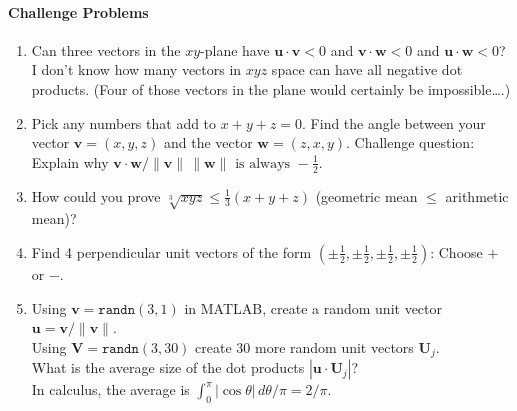 \documentclass[14pt, a4paper]{article}
\begin{document}
\paragraph{Challenge Problems}
\begin{enumerate}[resume]
    \item Can three vectors in the $xy$-plane have $\boldsymbol{u} \cdot \boldsymbol{v} < 0$ and $\boldsymbol{v} \cdot \boldsymbol{w} < 0$ and $\boldsymbol{u} \cdot \boldsymbol{w} < 0$? \\
          I don't know how many vectors in $xyz$ space can have all negative dot products. (Four of those vectors in the plane would certainly be impossible\dots.)

    \item Pick any numbers that add to $x + y + z = 0$. Find the angle between your vector $\boldsymbol{v} = (x, y, z)$ and the vector $\boldsymbol{w} = (z, x, y)$. Challenge question: Explain why
          $
              \boldsymbol{v} \cdot \boldsymbol{w} / \|\boldsymbol{v}\| \, \|\boldsymbol{w}\| \text{ is always } -\frac{1}{2}.
          $

    \item How could you prove $\sqrt[3]{xyz} \le \frac{1}{3}(x + y + z)$ (geometric mean $\le$ arithmetic mean)?

    \item Find 4 perpendicular unit vectors of the form $\left(\pm \tfrac{1}{2}, \pm \tfrac{1}{2}, \pm \tfrac{1}{2}, \pm \tfrac{1}{2}\right)$: Choose $+$ or $-$.

    \item Using $\boldsymbol{v} = \texttt{randn}(3,1)$ in \textcolor{blue!60!white}{MATLAB}, create a random unit vector $\boldsymbol{u} = \boldsymbol{v}/\|\boldsymbol{v}\|$.
          \\ Using $\boldsymbol{V} = \texttt{randn}(3,30)$ create 30 more random unit vectors $\boldsymbol{U}_j$.
          \\ What is the average size of the dot products $|\boldsymbol{u} \cdot \boldsymbol{U}_j|$?
          \\ In calculus, the average is $\displaystyle \int_0^\pi |\cos\theta| \,{d\theta}/{\pi} = {2}/{\pi}$.
\end{enumerate}
\end{document}
